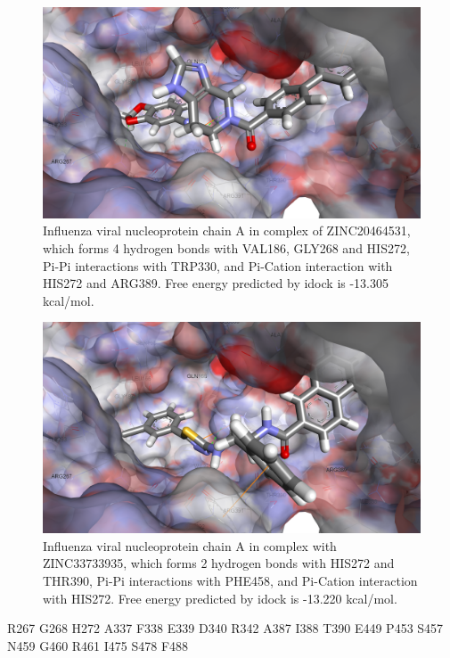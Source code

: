 \begin{figure}
\centering
\includegraphics[width=\linewidth]{../influenza/2IQH-ZINC20464531.png}
\caption{Influenza viral nucleoprotein chain A in complex of ZINC20464531, which forms 4 hydrogen bonds with VAL186, GLY268 and HIS272, Pi-Pi interactions with TRP330, and Pi-Cation interaction with HIS272 and ARG389. Free energy predicted by idock is -13.305 kcal/mol.}
\label{influenza:2IQH-ZINC20464531}
\end{figure}

\begin{figure}
\centering
\includegraphics[width=\linewidth]{../influenza/2IQH-ZINC33733935.png}
\caption{Influenza viral nucleoprotein chain A in complex with ZINC33733935, which forms 2 hydrogen bonds with HIS272 and THR390, Pi-Pi interactions with PHE458, and Pi-Cation interaction with HIS272. Free energy predicted by idock is -13.220 kcal/mol.}
\label{influenza:2IQH-ZINC33733935}
\end{figure}

R267
G268
H272
A337
F338
E339
D340
R342
A387
I388
T390
E449
P453
S457
N459
G460
R461
I475
S478
F488

